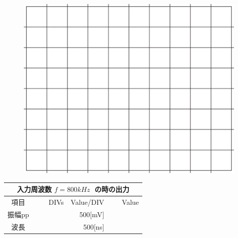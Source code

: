 \documentclass[uplatex,a4paper,11pt,oneside,openany]{jsbook}
\begin{document}
\begin{multicols}{2}
  \begin{figure}[H]
     \centering
      \includegraphics[keepaspectratio, scale=0.28, angle=0]
                  {figs/eps/grid.eps}
                  \label{fig:grid50mV}
  \end{figure}

  \begin{spacing}{1.5}
  \begin{tabular}{|c||r|r|r|}
    \multicolumn{4}{c}{入力周波数 $f=800kHz\;$ の時の出力} \\ \hline
    項目 & DIVs & Value/DIV & Value \\ \hline \hline
    振幅pp & 　　　　 & 500[mV]& 　　　　 \\ \hline
    波長 & 　　　　 & 500[ns]& 　　　　 \\ \hline
  \end{tabular}
\end{spacing}
\end{multicols}

\vfill
\end{document}
